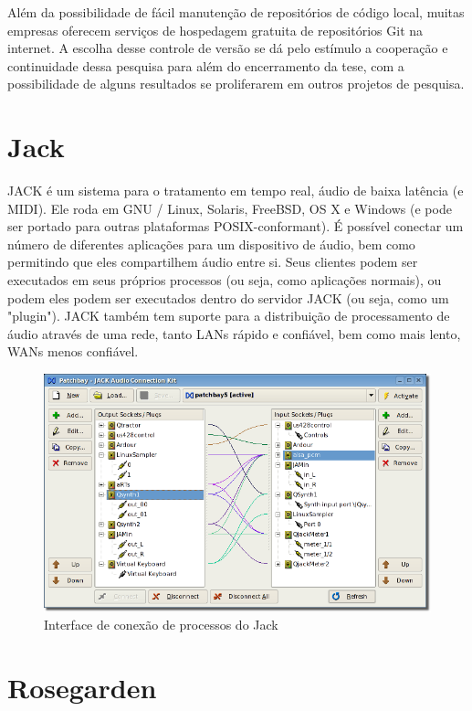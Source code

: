 \documentclass[draft]{ppgmus}
\begin{document}
Além da possibilidade de fácil manutenção de repositórios de código local, muitas empresas oferecem serviços de
hospedagem gratuita de repositórios Git na internet. A escolha desse controle de versão se dá pelo estímulo a cooperação e 
continuidade dessa pesquisa para além do encerramento da tese, com a possibilidade de alguns resultados se proliferarem
em outros projetos de pesquisa.



\section{Jack}

JACK é um sistema para o tratamento em tempo real, áudio de baixa latência (e MIDI). 
Ele roda em GNU / Linux, Solaris, FreeBSD, OS X e Windows (e pode ser portado para outras plataformas 
POSIX-conformant). É possível conectar um número de diferentes aplicações para um dispositivo de áudio, 
bem como permitindo que eles compartilhem áudio entre si. Seus clientes podem ser executados em seus próprios 
processos (ou seja, como aplicações normais), ou podem eles podem ser executados dentro do servidor JACK 
(ou seja, como um "plugin"). JACK também tem suporte para a distribuição de processamento de áudio através de 
uma rede, tanto LANs rápido e confiável, bem como mais lento, WANs menos confiável.

\begin{figure}
\includegraphics[scale=.7]{qjackctl}
\caption{Interface de conexão de processos do Jack}
\label{jack}
\end{figure}



\section{Rosegarden}
\end{document}
